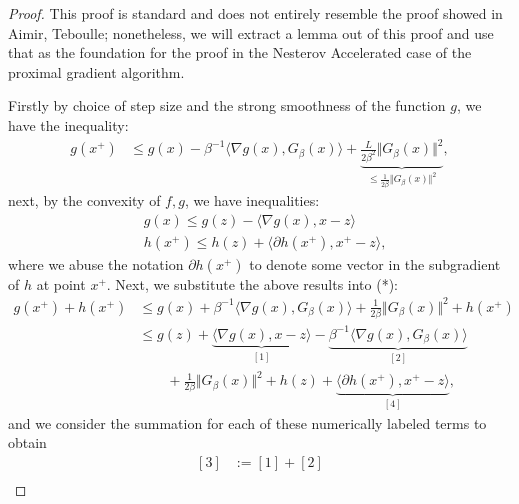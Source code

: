 \documentclass[]{article}
\theoremstyle{definition}
\begin{document}
        \begin{proof}
            This proof is standard and does not entirely resemble the proof showed in Aimir, Teboulle\cite{paper:FISTA}; nonetheless, we will extract a lemma out of this proof and use that as the foundation for the proof in the Nesterov Accelerated case of the proximal gradient algorithm.  
            \par
            Firstly by choice of step size and the strong smoothness of the function $g$, we have the inequality: 
            \begin{align*}
                g(x^+) 
                & \le 
                g(x) - \beta^{-1}\langle \nabla g(x), G_\beta(x)\rangle + \underbrace{\frac{L}{2\beta^2}\Vert G_\beta(x)\Vert^2}_
                {
                    \le \frac{1}{2\beta}\Vert G_\beta(x)\Vert^2
                }, \tag{*}
            \end{align*}
            next, by the convexity of $f, g$, we have inequalities: 
            \begin{align*}
                & g(x) \le g(z) - \langle \nabla g(x), x - z\rangle
                \\
                & h(x^+)\le h(z) + \langle \partial h(x^+), x^+ - z\rangle, 
            \end{align*}
            where we abuse the notation $\partial h(x^+)$ to denote some vector in the subgradient of $h$ at point $x^+$. Next, we substitute the above results into (*): 
            \begin{align*}
                g(x^+) + h(x^+) 
                & \le 
                g(x) + \beta^{-1}\langle \nabla g(x), G_\beta(x)\rangle + \frac{1}{2\beta}\Vert G_\beta(x)\Vert^2 + h(x^+) 
                \\
                & \le 
                g(z) + 
                \underbrace{\langle \nabla g(x), x - z\rangle }_{[1]}
                - 
                \underbrace{\beta^{-1}\langle \nabla g(x), G_\beta(x)\rangle}_{[2]}
                \\& \quad \quad 
                + 
                \frac{1}{2\beta}\Vert G_\beta(x)\Vert^2 + h(z) + 
                \underbrace{\langle \partial h(x^+), x^+ - z\rangle}_{[4]}, 
                \tag{$\nabla$}
            \end{align*}
            and we consider the summation for each of these numerically labeled terms to obtain
            \begin{align*}
                {[3]}& := [1] + [2]
                \\

\end{align*}
\end{proof}
\end{document}
